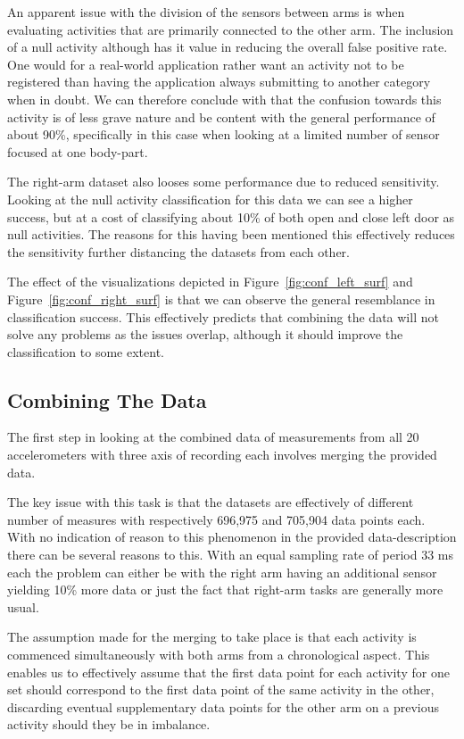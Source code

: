 \documentclass{sig-alternate}
\begin{document}
An apparent issue with the division of the sensors between arms is when evaluating activities that are primarily connected to the other arm. The inclusion of a null activity although has it value in reducing the overall false positive rate. One would for a real-world application rather want an activity not to be registered than having the application always submitting to another category when in doubt. We can therefore conclude with that the confusion towards this activity is of less grave nature and be content with the general performance of about 90\%, specifically in this case when looking at a limited number of sensor focused at one body-part.

The right-arm dataset also looses some performance due to reduced sensitivity. Looking at the null activity classification for this data we can see a higher success, but at a cost of classifying about 10\% of both open and close left door as null activities. The reasons for this having been mentioned this effectively reduces the sensitivity further distancing the datasets from each other.

The effect of the visualizations depicted in Figure~\ref{fig:conf_left_surf} and Figure~\ref{fig:conf_right_surf} is that we can observe the general resemblance in classification success. This effectively predicts that combining the data will not solve any problems as the issues overlap, although it should improve the classification to some extent.

\subsection{Combining The Data}
The first step in looking at the combined data of measurements from all 20 accelerometers with three axis of recording each involves merging the provided data.

The key issue with this task is that the datasets are effectively of different number of measures with respectively 696,975 and 705,904 data points each. With no indication of reason to this phenomenon in the provided data-description there can be several reasons to this. With an equal sampling rate of period 33 ms each the problem can either be with the right arm having an additional sensor yielding 10\% more data or just the fact that right-arm tasks are generally more usual. 

The assumption made for the merging to take place is that each activity is commenced simultaneously with both arms from a chronological aspect. This enables us to effectively assume that the first data point for each activity for one set should correspond to the first data point of the same activity in the other, discarding eventual supplementary data points for the other arm on a previous activity should they be in imbalance.
\end{document}
